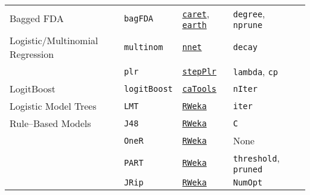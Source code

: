 \documentclass[12pt]{article}
\begin{document}
\begin{landscape}
\begin{longtable}{lllll}
      Bagged FDA &
         \texttt{bagFDA} & 
             {\tt \href{http://cran.r-project.org/web/packages/caret/index.html}{caret}},   {\tt \href{http://cran.r-project.org/web/packages/earth/index.html}{earth}}      & 
            \texttt{degree}, \texttt{nprune} \\   
            
\rowcolor[rgb]{.95, .95, .95}                     
      Logistic/Multinomial Regression &
         \texttt{multinom} & 
             {\tt \href{http://cran.r-project.org/web/packages/nnet/index.html}{nnet}}     & 
            \texttt{decay}& \\   
      
\rowcolor[rgb]{.95, .95, .95}               
   &
         \texttt{plr} & 
             {\tt \href{http://cran.r-project.org/web/packages/stepPlr/index.html}{stepPlr}}     & 
            \texttt{lambda}, \texttt{cp} & \\     
            
      
      LogitBoost &      
         \texttt{logitBoost} & 
             {\tt \href{http://cran.r-project.org/web/packages/caTools/index.html}{caTools}}      &          
            \texttt{nIter}\\              
            
\rowcolor[rgb]{.95, .95, .95}                     
      Logistic Model Trees &
         \texttt{LMT} & 
            {\tt \href{http://cran.r-project.org/web/packages/RWeka/index.html}{RWeka}}   & 
            \texttt{iter}  \\  
            
      Rule--Based Models &
         \texttt{J48} & 
           {\tt \href{http://cran.r-project.org/web/packages/RWeka/index.html}{RWeka}}   & 
            \texttt{C}  \\  
            
       &
         \texttt{OneR} & 
           {\tt \href{http://cran.r-project.org/web/packages/RWeka/index.html}{RWeka}}   & 
            None  \\  
            
       &
         \texttt{PART} & 
           {\tt \href{http://cran.r-project.org/web/packages/RWeka/index.html}{RWeka}}   & 
            \texttt{threshold}, \texttt{pruned}   \\  
            
        &
         \texttt{JRip} & 
           {\tt \href{http://cran.r-project.org/web/packages/RWeka/index.html}{RWeka}}    & 
            \texttt{NumOpt}   \\


\end{longtable}
\end{landscape}
\end{document}
